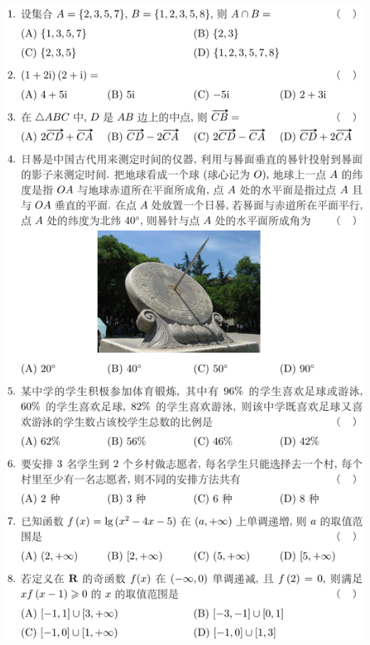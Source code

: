 \documentclass[11pt,a4paper]{ctexart}
\begin{document}
\begin{paracol}{2}
\includegraphics[width=\linewidth]{figure03.png}
\newpage
{}


\end{paracol}
\end{document}
